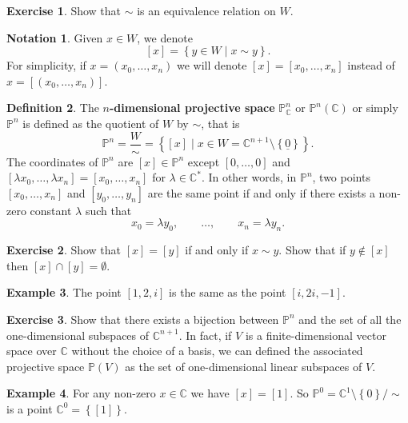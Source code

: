 \documentclass{article}
\newcommand{\C}{\mathbb{C}}
\renewcommand{\P}{\mathbb{P}}
\newcommand{\rb}[1]{\left( #1 \right)}
\renewcommand{\sb}[1]{\left[ #1 \right]}
\newcommand{\cb}[1]{\left\{ #1 \right\}}
\theoremstyle{definition}\newtheorem{definition}{Definition}[section]
\theoremstyle{definition}\newtheorem{notation}[definition]{Notation}
\theoremstyle{definition}\newtheorem{remark}[definition]{Remark}
\theoremstyle{definition}\newtheorem{example}[definition]{Example}
\theoremstyle{definition}\newtheorem{fact}{Fact}
\theoremstyle{definition}\newtheorem{exercise}{Exercise}
\begin{document}
\begin{exercise}
Show that $ \sim $ is an equivalence relation on $ W $.
\end{exercise}

\begin{notation}
Given $ x \in W $, we denote
$$ \sb{x} = \cb{y \in W \mid x \sim y}. $$
For simplicity, if $ x = \rb{x_0, \dots, x_n} $ we will denote $ \sb{x} = \sb{x_0, \dots, x_n} $ instead of $ x = \sb{\rb{x_0, \dots, x_n}} $.
\end{notation}

\begin{definition}
The \textbf{$ n $-dimensional projective space} $ \P^n_\C $ or $ \P^n\rb{\C} $ or simply $ \P^n $ is defined as the quotient of $ W $ by $ \sim $, that is
$$ \P^n = \dfrac{W}{\sim} = \cb{\sb{x} \mid x \in W = \C^{n + 1} \setminus \cb{\underline{0}}}. $$
The coordinates of $ \P^n $ are $ \sb{x} \in \P^n $ except $ \sb{0, \dots, 0} $ and $ \sb{\lambda x_0, \dots, \lambda x_n} = \sb{x_0, \dots, x_n} $ for $ \lambda \in \C^* $. In other words, in $ \P^n $, two points $ \sb{x_0, \dots, x_n} $ and $ \sb{y_0, \dots, y_n} $ are the same point if and only if there exists a non-zero constant $ \lambda $ such that
$$ x_0 = \lambda y_0, \qquad \dots, \qquad x_n = \lambda y_n. $$
\end{definition}

\begin{exercise}
Show that $ \sb{x} = \sb{y} $ if and only if $ x \sim y $. Show that if $ y \notin \sb{x} $ then $ \sb{x} \cap \sb{y} = \emptyset $.
\end{exercise}

\begin{example}
The point $ \sb{1, 2, i} $ is the same as the point $ \sb{i, 2i, -1} $.
\end{example}

\begin{exercise}
Show that there exists a bijection between $ \P^n $ and the set of all the one-dimensional subspaces of $ \C^{n + 1} $. In fact, if $ V $ is a finite-dimensional vector space over $ \C $ without the choice of a basis, we can defined the associated projective space $ \P\rb{V} $ as the set of one-dimensional linear subspaces of $ V $.
\end{exercise}

\begin{example}
For any non-zero $ x \in \C $ we have $ \sb{x} = \sb{1} $. So $ \P^0 = \C^1 \setminus \cb{0} / \sim $ is a point $ \C^0 = \cb{\sb{1}} $.
\end{example}
\end{document}
